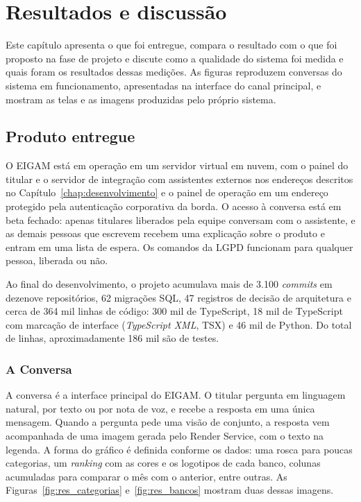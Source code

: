 \chapter{Resultados e discussão}\label{chap:resultados}

Este capítulo apresenta o que foi entregue, compara o resultado com o que foi proposto na fase de projeto e discute como a qualidade do sistema foi medida e quais foram os resultados dessas medições. As figuras reproduzem conversas do sistema em funcionamento, apresentadas na interface do canal principal, e mostram as telas e as imagens produzidas pelo próprio sistema.
\section{Produto entregue}

O EIGAM está em operação em um servidor virtual em nuvem, com o painel do titular e o servidor de integração com assistentes externos nos endereços descritos no Capítulo~\ref{chap:desenvolvimento} e o painel de operação em um endereço protegido pela autenticação corporativa da borda. O acesso à conversa está em beta fechado: apenas titulares liberados pela equipe conversam com o assistente, e as demais pessoas que escrevem recebem uma explicação sobre o produto e entram em uma lista de espera. Os comandos da LGPD funcionam para qualquer pessoa, liberada ou não.

Ao final do desenvolvimento, o projeto acumulava mais de 3.100 \textit{commits} em dezenove repositórios, 62 migrações SQL, 47 registros de decisão de arquitetura e cerca de 364 mil linhas de código: 300 mil de TypeScript, 18 mil de TypeScript com marcação de interface (\textit{TypeScript XML}, TSX) e 46 mil de Python. Do total de linhas, aproximadamente 186 mil são de testes.
\subsection{A Conversa}

A conversa é a interface principal do EIGAM. O titular pergunta em linguagem natural, por texto ou por nota de voz, e recebe a resposta em uma única mensagem. Quando a pergunta pede uma visão de conjunto, a resposta vem acompanhada de uma imagem gerada pelo Render Service, com o texto na legenda. A forma do gráfico é definida conforme os dados: uma rosca para poucas categorias, um \textit{ranking} com as cores e os logotipos de cada banco, colunas acumuladas para comparar o mês com o anterior, entre outras. As Figuras~\ref{fig:res_categorias} e~\ref{fig:res_bancos} mostram duas dessas imagens.

